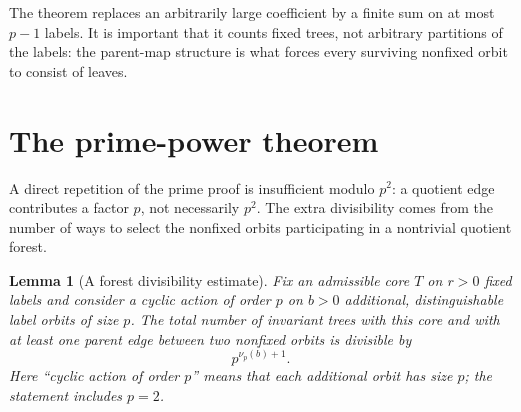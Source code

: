 \documentclass[11pt,letterpaper]{article}
\newtheorem{lemma}[theorem]{Lemma}
\theoremstyle{definition}
\theoremstyle{remark}
\begin{document}
The theorem replaces an arbitrarily large coefficient by a finite sum
on at most $p-1$ labels. It is important that it counts fixed trees,
not arbitrary partitions of the labels: the parent-map structure is
what forces every surviving nonfixed orbit to consist of leaves.

\section{The prime-power theorem}\label{sec:primepower}
A direct repetition of the prime proof is insufficient modulo $p^2$:
a quotient edge contributes a factor $p$, not necessarily $p^2$.
The extra divisibility comes from the number of ways to select the
nonfixed orbits participating in a nontrivial quotient forest.

\begin{lemma}[A forest divisibility estimate]\label{lem:forest}
Fix an admissible core $T$ on $r>0$ fixed labels and consider a
cyclic action of order $p$ on $b>0$ additional,
distinguishable label orbits of size $p$. The total number of invariant
trees with this core and with at least one parent edge between two
nonfixed orbits is divisible by
\[
 p^{\nu_p(b)+1}.
\]
Here ``cyclic action of order $p$'' means that each additional orbit has
size $p$; the statement includes $p=2$.
\end{lemma}
\end{document}
